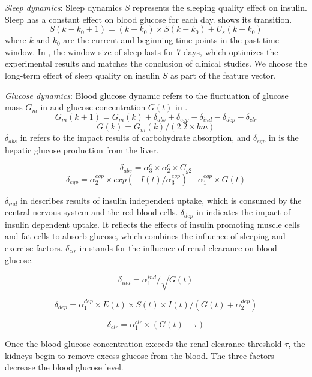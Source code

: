 {\textit{Sleep dynamics}:
Sleep dynamics $S$ represents the sleeping quality effect on insulin.
Sleep has a constant effect on blood glucose for each day.
 shows its transition.
\begin{equation}\label{Eq:S}
S(k-k_0+1)=(k-k_0) \times S(k-k_0)+U_{s}(k-k_0)
\end{equation}
where $k$ and $k_0$ are the current and beginning time points in the past time window.
In \sysname, the window size of sleep lasts for 7 days, which optimizes the experimental results and matches the conclusion of clinical studies.
We choose the long-term effect of sleep quality on insulin $S$ as part of the feature vector.

\textit{Glucose dynamics}:
Blood glucose dynamic refers to the fluctuation of glucose mass $G_m$ in  and glucose concentration $G(t)$ in .
\begin{equation}\label{Eq:Gm}
G_m(k+1)=G_m(k)+\delta_{abs}+\delta_{egp}-\delta_{ind}-\delta_{dep}-\delta_{clr}
\end{equation}
\begin{equation}\label{Eq:G}
G(k)=G_m(k)/(2.2 \times bm)
\end{equation}
$\delta_{abs}$ in  refers to the impact results of carbohydrate absorption, and $\delta_{egp}$ in  is the hepatic glucose production from the liver.

\begin{equation}\label{Eq:abs}
  \delta_{abs}=\alpha_3^c \times \alpha_2^c \times C_{g2}
\end{equation}
\begin{equation}\label{Eq:egp}
  \delta_{egp}=\alpha_2^{egp} \times exp(-I(t)/\alpha_3^{egp})-\alpha_1^{egp} \times G(t)
\end{equation}

$\delta_{ind}$ in  describes results of insulin independent uptake, which is consumed by the central nervous system and the red blood cells.
$\delta_{dep}$ in  indicates the impact of insulin dependent uptake.
It reflects the effects of insulin promoting muscle cells and fat cells to absorb glucose, which combines the influence of sleeping and exercise factors.
$\delta_{clr}$ in  stands for the influence of renal clearance on blood glucose.

\begin{equation}\label{Eq:ind}
  \delta_{ind}=\alpha_1^{ind}/\sqrt{G(t)}
\end{equation}

\begin{equation}\label{Eq:dep}
  \delta_{dep}=\alpha_1^{dep} \times  E(t) \times S(t) \times I(t)/(G(t)+\alpha_2^{dep})
\end{equation}

\begin{equation}\label{Eq:clr}
  \delta_{clr}=\alpha_1^{clr} \times (G(t)-\tau)
\end{equation}

Once the blood glucose concentration exceeds the renal clearance threshold $\tau$, the kidneys begin to remove excess glucose from the blood.
The three factors decrease the blood glucose level.
}

